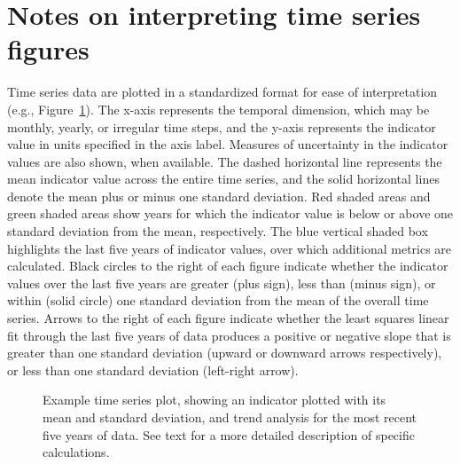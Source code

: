 \documentclass[
  letterpaper,
  oneside,
  open=any]{scrbook}
\begin{document}
\section{Notes on interpreting time series
figures}\label{notes-on-interpreting-time-series-figures}

Time series data are plotted in a standardized format for ease of
interpretation (e.g., Figure~\ref{fig-explot}). The x-axis represents
the temporal dimension, which may be monthly, yearly, or irregular time
steps, and the y-axis represents the indicator value in units specified
in the axis label. Measures of uncertainty in the indicator values are
also shown, when available. The dashed horizontal line represents the
mean indicator value across the entire time series, and the solid
horizontal lines denote the mean plus or minus one standard deviation.
Red shaded areas and green shaded areas show years for which the
indicator value is below or above one standard deviation from the mean,
respectively. The blue vertical shaded box highlights the last five
years of indicator values, over which additional metrics are calculated.
Black circles to the right of each figure indicate whether the indicator
values over the last five years are greater (plus sign), less than
(minus sign), or within (solid circle) one standard deviation from the
mean of the overall time series. Arrows to the right of each figure
indicate whether the least squares linear fit through the last five
years of data produces a positive or negative slope that is greater than
one standard deviation (upward or downward arrows respectively), or less
than one standard deviation (left-right arrow).

\begin{figure}


\caption{\label{fig-explot}Example time series plot, showing an
indicator plotted with its mean and standard deviation, and trend
analysis for the most recent five years of data. See text for a more
detailed description of specific calculations.}

\end{figure}%
\end{document}
